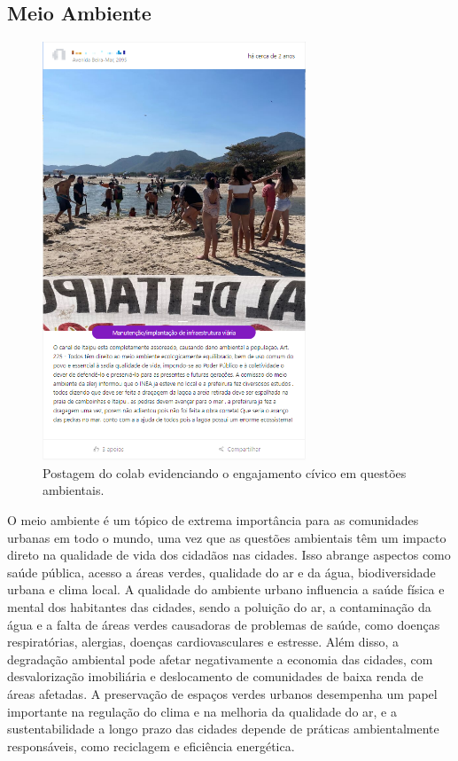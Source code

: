 \subsection{Meio Ambiente}

\begin{figure}[htb]
	\centering
	\includegraphics[width=0.7\textwidth]{images/colab_posts_social_environment.png}
	\caption{Postagem do colab evidenciando o engajamento cívico em questões ambientais.}
	\label{fig:colab_posts_social_environment}
\end{figure}

O meio ambiente é um tópico de extrema importância para as comunidades urbanas em todo o mundo, uma vez que as questões ambientais têm um impacto direto na qualidade de vida dos cidadãos nas cidades. Isso abrange aspectos como saúde pública, acesso a áreas verdes, qualidade do ar e da água, biodiversidade urbana e clima local. A qualidade do ambiente urbano influencia a saúde física e mental dos habitantes das cidades, sendo a poluição do ar, a contaminação da água e a falta de áreas verdes causadoras de problemas de saúde, como doenças respiratórias, alergias, doenças cardiovasculares e estresse. Além disso, a degradação ambiental pode afetar negativamente a economia das cidades, com desvalorização imobiliária e deslocamento de comunidades de baixa renda de áreas afetadas. A preservação de espaços verdes urbanos desempenha um papel importante na regulação do clima e na melhoria da qualidade do ar, e a sustentabilidade a longo prazo das cidades depende de práticas ambientalmente responsáveis, como reciclagem e eficiência energética.

